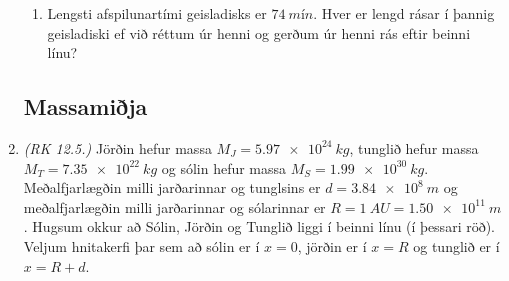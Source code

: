 \ifdefined \wholebook \else\documentclass[oneside]{book}\usepackage{EdlBook}\graphicspath{{figures/}}
\begin{document}
\begin{enumerate}[label = \textbf{Dæmi \thechapter.\arabic*.}]
\begin{enumerate}[label = \textbf{(\alph*)}]
    \item Lengsti afspilunartími geisladisks er $\SI{74}{mín}$. Hver er lengd rásar í þannig geisladiski ef við réttum úr henni og gerðum úr henni rás eftir beinni línu?
\end{enumerate}

\subsection*{Massamiðja}



\item \textit{(RK 12.5.)} Jörðin hefur massa $M_J = \SI{5.97e24}{kg}$, tunglið hefur massa $M_T = \SI{7.35e22}{kg}$ og sólin hefur massa $M_S = \SI{1.99e30}{kg}$. Meðalfjarlægðin milli jarðarinnar og tunglsins er $d = \SI{3.84e8}{m}$ og meðalfjarlægðin milli jarðarinnar og sólarinnar er $R = \SI{1}{AU} = \SI{1.50e11}{m}$. Hugsum okkur að Sólin, Jörðin og Tunglið liggi í beinni línu (í þessari röð). Veljum hnitakerfi þar sem að sólin er í $x = 0$, jörðin er í $x = R$ og tunglið er í $x = R+d$.


\end{enumerate}
\end{document}
